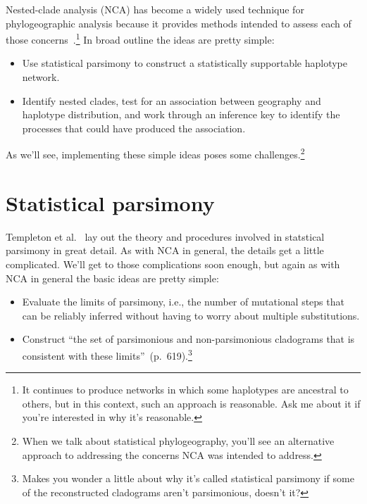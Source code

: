 \documentclass[12pt]{article}
\begin{document}
Nested-clade analysis (NCA) has become a widely used technique for
phylogeographic analysis because it provides methods intended to
assess each of those concerns~\cite{Templeton-2004}.\footnote{It
  continues to produce networks in which some haplotypes are ancestral
  to others, but in this context, such an approach is reasonable. Ask
  me about it if you're interested in why it's reasonable.} In broad
outline the ideas are pretty simple:

\begin{itemize}

\item Use statistical parsimony to construct a statistically
  supportable haplotype network.

\item Identify nested clades, test for an association between
  geography and haplotype distribution, and work through an inference
  key to identify the processes that could have produced the
  association.

\end{itemize}

As we'll see, implementing these simple ideas poses some
challenges.\footnote{When we talk about statistical phylogeography,
  you'll see an alternative approach to addressing the concerns NCA
  was intended to address.}

\section*{Statistical parsimony}

Templeton et al.~\cite{Templeton-etal-1992} lay out the theory and
procedures involved in statstical parsimony in great detail. As with
NCA in general, the details get a little complicated. We'll get to
those complications soon enough, but again as with NCA in general the
basic ideas are pretty simple:

\begin{itemize}

\item Evaluate the limits of parsimony, i.e., the number of mutational
  steps that can be reliably inferred without having to worry about
  multiple substitutions.

\item Construct ``the set of parsimonious and non-parsimonious
  cladograms that is consistent with these limits''~(p.\
  619).\footnote{Makes you wonder a little about why it's called
  statistical parsimony if some of the reconstructed cladograms aren't
  parsimonious, doesn't it?}

\end{itemize}
\end{document}
